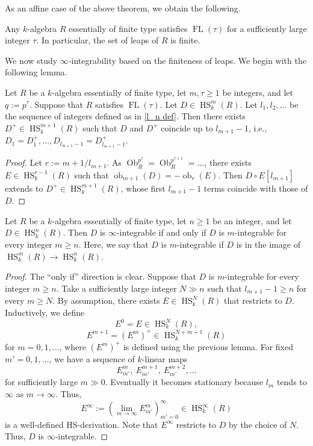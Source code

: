 \documentclass{amsart}
\newcommand{\HS}{\operatorname{HS}}
\newcommand{\FL}[1]{\operatorname{FL}(#1)}
\begin{document}
As an affine case of the above theorem, we obtain the following.

\begin{theorem}\label{eft alg thm}
    Any $k$-algebra $R$ essentially of finite type satisfies $\FL{\tau}$ for a sufficiently large integer $\tau$. In particular, the set of leaps of $R$ is finite.
\end{theorem}

We now study $\infty$-integrability based on the finiteness of leaps. We begin with the following lemma.

\begin{lemma}\label{mn int lem}
    Let $R$ be a $k$-algebra essentially of finite type, let $m, \tau\ge 1$ be integers, and let $q:=p^\tau$. Suppose that $R$ satisfies $\FL{\tau}$. Let $D\in \HS_k^m(R)$. Let $l_1,l_2,\dots$ be the sequence of integers defined as in \ref{l_n def}. Then there exists $D^+\in \HS_k^{m+1}(R)$ such that $D$ and $D^+$ coincide up to $l_{m+1}-1$, i.e., $D_1=D^+_1,\dots, D_{l_{m+1}-1}= D_{l_{m+1}-1}^+$.
\end{lemma}

\begin{proof}
    Let $r:={m+1}/l_{m+1}$. As $\operatorname{Ob}_R^{p^\tau}=\operatorname{Ob}_R^{p^{\tau+1}}=\dots$, there exists $E\in \HS_k^{r-1}(R)$ such that $\operatorname{ob}_{m+1}(D)=-\operatorname{ob}_r(E)$. Then $D\circ E[l_{m+1}]$ extends to $D^+\in  \HS_k^{m+1}(R)$, whose first $l_{m+1}-1$ terms coincide with those of $D$.
\end{proof}

\begin{theorem}\label{mn int theorem}
    Let $R$ be a $k$-algebra essentially of finite type, let $n\ge 1$ be an integer, and let $D\in \HS_k^n(R)$. Then $D$ is $\infty$-integrable if and only if $D$ is $m$-integrable for every integer $m\ge n$. Here, we say that $D$ is $m$-integrable if $D$ is in the image of $\HS_k^m(R)\to \HS_k^n(R)$.
\end{theorem}

\begin{proof}
    The ``only if'' direction is clear. Suppose that $D$ is $m$-integrable for every integer $m\ge n$. Take a sufficiently large integer $N\gg n$ such that $l_{m+1}-1\ge n$ for every $m\ge N$. By assumption, there exists $E\in \HS_k^N(R)$ that restricts to $D$. Inductively, we define
    $$E^0=E\in \HS_k^N(R),$$
    $$E^{m+1}=(E^m)^+ \in \HS_k^{N+m+1}(R)$$
    for $m=0,1,\dots$, where $(E^m)^+$ is defined using the previous lemma. For fixed $m'=0,1,\dots$, we have a sequence of $k$-linear maps
    $$ E^{m}_{m'}, \ E^{m+1}_{m'},\ E^{m+2}_{m'},\dots$$
    for sufficiently large $m\gg 0$. Eventually it becomes stationary because $l_m$ tends to $\infty$ as $m\to \infty$. Thus, 
    $$E^\infty:=(\lim_{m\to \infty}E^m_{m'})_{m'=0}^\infty \in \HS_k^\infty(R)$$
    is a well-defined HS-derivation. Note that $E^\infty$ restricts to $D$ by the choice of $N$. Thus, $D$ is $\infty$-integrable.
\end{proof}
\end{document}
